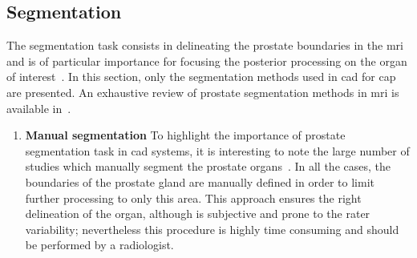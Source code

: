 \subsection{Segmentation}\label{subsec:chp3:img-reg:seg}
The segmentation task consists in delineating the prostate boundaries in the
\ac{mri} and is of particular importance for focusing the posterior processing
on the organ of interest~\cite{Ghose2012}.
In this section, only the segmentation methods used in \ac{cad} for \ac{cap}
are presented.
An exhaustive review of prostate segmentation methods in \ac{mri} is available
in~\cite{Ghose2012}.

\begin{enumerate}[leftmargin=*]

\item[] \textbf{Manual segmentation}
To highlight the importance of prostate segmentation task in \ac{cad} systems,
it is interesting to note the large number of studies which manually segment
the prostate
organs~\cite{Artan2009,Artan2010,Matulewicz2013,Niaf2011,Niaf2012,Ozer2009,Ozer2010,Puech2009,Vos2008,Vos2008a,trigui2016classification,trigui2017automatic,lehaire2014computer}.
In all the cases, the boundaries of the prostate gland are manually defined in
order to limit further processing to only this area.
This approach ensures the right delineation of the organ, although is
subjective and prone to the rater variability; nevertheless this procedure is
highly time consuming and should be performed by a radiologist.


\end{enumerate}
